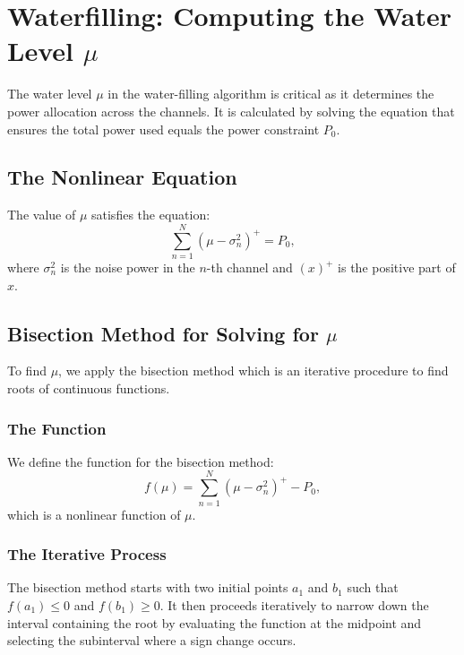 \section*{Waterfilling: Computing the Water Level \(\mu\)}

The water level \(\mu\) in the water-filling algorithm is critical as it determines the power allocation across the channels. It is calculated by solving the equation that ensures the total power used equals the power constraint \(P_0\).

\subsection*{The Nonlinear Equation}
The value of \(\mu\) satisfies the equation:
\begin{equation}
\sum_{n=1}^{N} (\mu - \sigma_n^2)^+ = P_0,
\end{equation}
where \(\sigma_n^2\) is the noise power in the \(n\)-th channel and \((x)^+\) is the positive part of \(x\).

\subsection*{Bisection Method for Solving for \(\mu\)}
To find \(\mu\), we apply the bisection method which is an iterative procedure to find roots of continuous functions.

\subsubsection*{The Function}
We define the function for the bisection method:
\begin{equation}
f(\mu) = \sum_{n=1}^{N} (\mu - \sigma_n^2)^+ - P_0,
\end{equation}
which is a nonlinear function of \(\mu\).

\subsubsection*{The Iterative Process}
The bisection method starts with two initial points \(a_1\) and \(b_1\) such that \(f(a_1) \leq 0\) and \(f(b_1) \geq 0\). It then proceeds iteratively to narrow down the interval containing the root by evaluating the function at the midpoint and selecting the subinterval where a sign change occurs.

